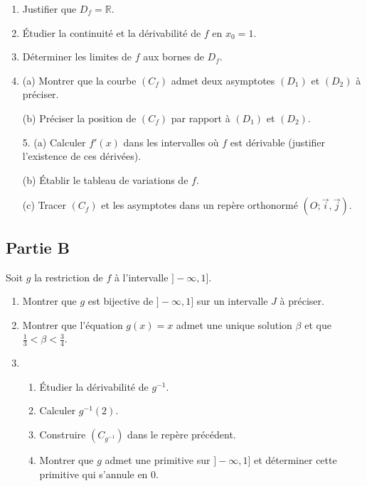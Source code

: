 \documentclass[12pt]{article}
\begin{document}
\begin{enumerate}
    \item Justifier que $D_f = \mathbb{R}$.
    \item Étudier la continuité et la dérivabilité de $f$ en $x_0 = 1$.
    \item Déterminer les limites de $f$ aux bornes de $D_f$.
    \item (a) Montrer que la courbe $(C_f)$ admet deux asymptotes $(D_1)$ et $(D_2)$ à préciser.
\end{enumerate}
\begin{enumerate}
    \item[(b)] Préciser la position de \( (C_f) \) par rapport à \( (D_1) \) et \( (D_2) \).
\end{enumerate}

\begin{enumerate}
    \item[5.] (a) Calculer \( f'(x) \) dans les intervalles où \( f \) est dérivable (justifier l’existence de ces dérivées).
    \item[(b)] Établir le tableau de variations de \( f \).
    \item[(c)] Tracer \( (C_f) \) et les asymptotes dans un repère orthonormé \( (O; \vec{i}, \vec{j}) \).
\end{enumerate}
\subsection*{Partie B}

Soit \( g \) la restriction de \( f \) à l’intervalle \( ] -\infty, 1] \).

\begin{enumerate}
    \item Montrer que \( g \) est bijective de \( ] -\infty, 1] \) sur un intervalle \( J \) à préciser.
    \item Montrer que l’équation \( g(x) = x \) admet une unique solution \( \beta \) et que \( \frac{1}{3} < \beta < \frac{3}{4} \).
    \item 
    \begin{enumerate}
        \item Étudier la dérivabilité de \( g^{-1} \).
        \item Calculer \( g^{-1}(2) \).
        \item Construire \( (C_{g^{-1}}) \) dans le repère précédent.
        \item Montrer que \( g \) admet une primitive sur \( ] -\infty, 1] \) et déterminer cette primitive qui s’annule en 0.
    \end{enumerate}
\end{enumerate}
\end{document}
